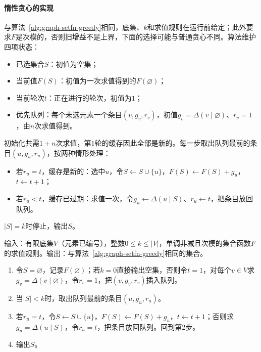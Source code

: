 \paragraph{惰性贪心的实现}
与算法~\ref{alg:graph-setfn-greedy}相同，底集、$k$和求值规则在运行前给定；此外要求$F$是次模的，否则旧增益不是上界，下面的选择可能与普通贪心不同。算法维护四项状态：
\begin{itemize}
  \item 已选集合$S$：初值为空集；
  \item 当前值$F(S)$：初值为一次求值得到的$F(\varnothing)$；
  \item 当前轮次$t$：正在进行的轮次，初值为$1$；
  \item 优先队列：每个未选元素一个条目$(v,g_v,r_v)$，初值$g_v=\Delta(v\mid\varnothing)$、$r_v=1$，由$n$次求值得到。
\end{itemize}
初始化共需$1+n$次求值，第$1$轮的缓存因此全部是新的。每一步取出队列最前的条目$(u,g_u,r_u)$，按两种情形处理：
\begin{itemize}
  \item 若$r_u=t$，缓存是新的：选中$u$，令$S\gets S\cup\{u\}$，$F(S)\gets F(S)+g_u$，$t\gets t+1$；
  \item 若$r_u<t$，缓存已过期：求值一次，令$g_u\gets\Delta(u\mid S)$、$r_u\gets t$，把条目放回队列。
\end{itemize}
$|S|=k$时停止，输出$S$。

\begin{algorithm}[惰性贪心]
\label{alg:graph-setfn-lazy-greedy}
输入：有限底集$V$（元素已编号），整数$0\leq k\leq|V|$，单调非减且次模的集合函数$F$的求值规则。输出：与算法~\ref{alg:graph-setfn-greedy}相同的集合。
\begin{enumerate}
  \item 令$S=\varnothing$，记录$F(\varnothing)$；若$k=0$直接输出空集，否则令$t=1$，对每个$v\in V$求$g_v=\Delta(v\mid\varnothing)$，令$r_v=1$，把$(v,g_v,r_v)$插入队列。
  \item 当$|S|<k$时，取出队列最前的条目$(u,g_u,r_u)$。
  \item 若$r_u=t$，令$S\gets S\cup\{u\}$，$F(S)\gets F(S)+g_u$，$t\gets t+1$；否则求$g_u=\Delta(u\mid S)$，令$r_u=t$，把条目放回队列。回到第2步。
  \item 输出$S$。
\end{enumerate}
\end{algorithm}

